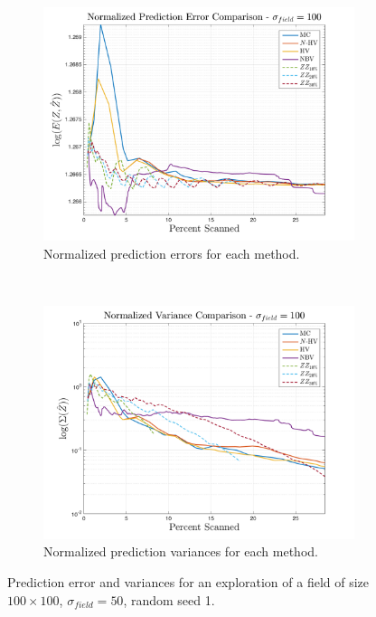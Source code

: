 \begin{figure}[htb!]
    \centering
    \begin{subfigure}[t]{0.75\textwidth}
        \centering
        \includegraphics[width=\linewidth]{figures/normalized_errors_30p_100x100_sf_100_seed_1_app_10}
        \captionsetup{skip=0.20\baselineskip,size=footnotesize}
        \caption{Normalized prediction errors for each method.}
    \end{subfigure}%
    \\
    \begin{subfigure}[t]{0.75\textwidth}
        \centering
        \includegraphics[width=\linewidth]{figures/normalized_variances_30p_100x100_sf_100_seed_1_app_10}
        \captionsetup{skip=0.20\baselineskip,size=footnotesize}
        \caption{Normalized prediction variances for each method.}
    \end{subfigure}%
    \captionsetup{skip=0.20\baselineskip}
    \caption{Prediction error and variances for an exploration of a field of size $100 \times 100$, $\sigma_{field} = 50$, random seed 1.}
    \label{fig:errvar50}
\end{figure}

